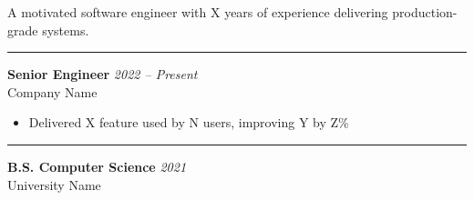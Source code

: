 \documentclass[10pt,a4paper]{article}
\begin{document}
\begin{minipage}[t]{0.7\textwidth}
\vspace{12pt}
\hspace{12pt}

{\small A motivated software engineer with X years of experience delivering production-grade systems.}

\vspace{10pt}
\noindent\hspace{12pt}\rule{0.88\textwidth}{0.3pt}

\vspace{4pt}
\hspace{12pt}
\begin{minipage}{0.88\textwidth}
\textbf{Senior Engineer} \hfill \textit{2022 -- Present} \\
{\small Company Name}
\begin{itemize}[leftmargin=1em, noitemsep, topsep=2pt]
  \item {\small Delivered X feature used by N users, improving Y by Z\%}
\end{itemize}
\end{minipage}

\vspace{10pt}
\noindent\hspace{12pt}\rule{0.88\textwidth}{0.3pt}

\vspace{4pt}
\hspace{12pt}
\begin{minipage}{0.88\textwidth}
\textbf{B.S. Computer Science} \hfill \textit{2021} \\
{\small University Name}
\end{minipage}

\end{minipage}
\end{document}
